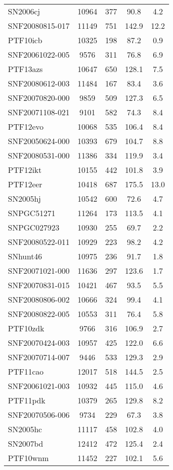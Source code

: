 \begin{longtable}{lcccc}
SN2006cj & 10964 & 377 & 90.8 & 4.2 \\
SNF20080815-017 & 11149 & 751 & 142.9 & 12.2 \\
PTF10icb & 10325 & 198 & 87.2 & 0.9 \\
SNF20061022-005 & 9576 & 311 & 76.8 & 6.9 \\
PTF13azs & 10647 & 650 & 128.1 & 7.5 \\
SNF20080612-003 & 11484 & 167 & 83.4 & 3.6 \\
SNF20070820-000 & 9859 & 509 & 127.3 & 6.5 \\
SNF20071108-021 & 9101 & 582 & 74.3 & 8.4 \\
PTF12evo & 10068 & 535 & 106.4 & 8.4 \\
SNF20050624-000 & 10393 & 679 & 104.7 & 8.8 \\
SNF20080531-000 & 11386 & 334 & 119.9 & 3.4 \\
PTF12ikt & 10155 & 442 & 101.8 & 3.9 \\
PTF12eer & 10418 & 687 & 175.5 & 13.0 \\
SN2005hj & 10542 & 600 & 72.6 & 4.7 \\
SNPGC51271 & 11264 & 173 & 113.5 & 4.1 \\
SNPGC027923 & 10930 & 255 & 69.7 & 2.2 \\
SNF20080522-011 & 10929 & 223 & 98.2 & 4.2 \\
SNhunt46 & 10975 & 236 & 91.7 & 1.8 \\
SNF20071021-000 & 11636 & 297 & 123.6 & 1.7 \\
SNF20070831-015 & 10421 & 467 & 93.5 & 5.5 \\
SNF20080806-002 & 10666 & 324 & 99.4 & 4.1 \\
SNF20080822-005 & 10553 & 311 & 76.4 & 5.8 \\
PTF10zdk & 9766 & 316 & 106.9 & 2.7 \\
SNF20070424-003 & 10957 & 425 & 122.0 & 6.6 \\
SNF20070714-007 & 9446 & 533 & 129.3 & 2.9 \\
PTF11cao & 12017 & 518 & 144.5 & 2.5 \\
SNF20061021-003 & 10932 & 445 & 115.0 & 4.6 \\
PTF11pdk & 10379 & 265 & 129.8 & 8.2 \\
SNF20070506-006 & 9734 & 229 & 67.3 & 3.8 \\
SN2005hc & 11117 & 458 & 102.8 & 4.0 \\
SN2007bd & 12412 & 472 & 125.4 & 2.4 \\
PTF10wnm & 11452 & 227 & 102.1 & 5.6 \\

\end{longtable}
